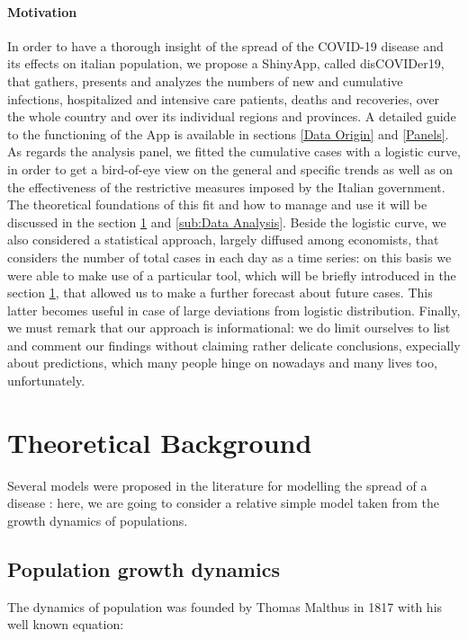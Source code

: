 \documentclass[
12pt, %
a4paper, %
oneside, %
headinclude,footinclude, %
BCOR5mm, %
]{scrartcl}
\begin{document}
\paragraph{Motivation} \label{Motivation}
In order to have a thorough insight of the spread of the COVID-19 disease and its effects on italian population, we propose a ShinyApp, called disCOVIDer19, that gathers, presents and analyzes the numbers of new and cumulative infections, hospitalized and intensive care patients, deaths and recoveries, over the whole country and over its individual regions and provinces. A detailed guide to the functioning of the App is available in sections \ref{Data Origin} and \ref{Panels}. As regards the analysis panel, we fitted the cumulative cases with a logistic curve, in order to get a bird-of-eye view on the general and specific trends as well as on the effectiveness of the restrictive measures imposed by the Italian government. The theoretical foundations of this fit and how to manage and use it will be discussed in the section \ref{Theoretical Background} and \ref{sub:Data Analysis}. Beside the logistic curve, we also considered a statistical approach, largely diffused among economists, that considers the number of total cases in each day as a time series: on this basis we were able to make use of a particular tool, which will be briefly introduced in the section \ref{Theoretical Background}, that allowed us to make a further forecast about future cases. This latter becomes useful in case of large deviations from logistic distribution.
Finally, we must remark that our approach is informational: we do limit ourselves to list and comment our findings without claiming rather delicate conclusions, expecially about predictions, which many people hinge on nowadays and many lives too, unfortunately.
 

\section{Theoretical Background} \label{Theoretical Background}
Several models were proposed in the literature for modelling the spread of a disease \cite{keeling2011modeling}: here, we are going to consider a relative simple model taken from the growth dynamics of populations.

\subsection{Population growth dynamics}
The dynamics of population was founded by Thomas Malthus in 1817 \cite{malthus1817essay} with his well known equation: 
\end{document}
